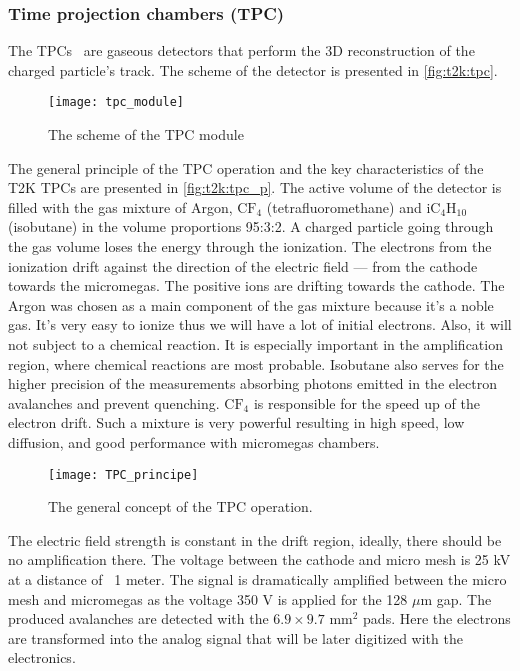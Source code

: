 \documentclass[../main.tex]{subfiles}
\begin{document}
\subsubsection{Time projection chambers (TPC)}
The TPCs~\cite{Abgrall2011} are gaseous detectors that perform the 3D reconstruction of the charged particle's track. The scheme of the detector is presented in \autoref{fig:t2k:tpc}.

\begin{figure}[!ht]
  \centering
  \texttt{[image: tpc\_module]}
  \caption{The scheme of the TPC module}
  \label{fig:t2k:tpc}
\end{figure}

The general principle of the TPC operation and the key characteristics of the T2K TPCs are presented in \autoref{fig:t2k:tpc_p}. The active volume of the detector is filled with the gas mixture of Argon, $\text{CF}_4$ (tetrafluoromethane) and $\text{iC}_4\text{H}_{10}$ (isobutane) in the volume proportions 95:3:2. A charged particle going through the gas volume loses the energy through the ionization. The electrons from the ionization drift against the direction of the electric field --- from the cathode towards the micromegas. The positive ions are drifting towards the cathode. The Argon was chosen as a main component of the gas mixture because it's a noble gas. It's very easy to ionize thus we will have a lot of initial electrons. Also, it will not subject to a chemical reaction. It is especially important in the amplification region, where chemical reactions are most probable. Isobutane also serves for the higher precision of the measurements absorbing photons emitted in the electron avalanches and prevent quenching. $\text{CF}_4$ is responsible for the speed up of the electron drift. Such a mixture is very powerful resulting in high speed, low diffusion, and good performance with micromegas chambers.

\begin{figure}[!ht]
  \centering
  \texttt{[image: TPC\_principe]}
  \caption{The general concept of the TPC operation.}
  \label{fig:t2k:tpc_p}
\end{figure}

The electric field strength is constant in the drift region, ideally, there should be no amplification there. The voltage between the cathode and micro mesh is 25 kV at a distance of ~1 meter. The signal is dramatically amplified between the micro mesh and micromegas as the voltage 350 V is applied for the 128 $\mu \text{m}$ gap. The produced avalanches are detected with the $6.9\times9.7$ $\text{mm}^2$ pads. Here the electrons are transformed into the analog signal that will be later digitized with the electronics.
\end{document}
